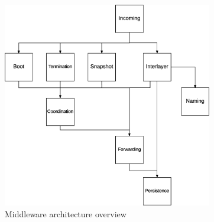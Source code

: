 \begin{figure}[H]
  \centering
  \includegraphics[height=9cm]{images/solution/mw/overview.eps}
  \caption{Middleware architecture overview}
  \label{fig:mw-arch-over}
\end{figure}










